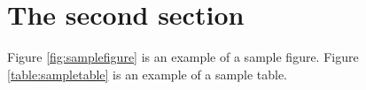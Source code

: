 \section{The second section}
Figure \ref{fig:samplefigure} is an example of a sample figure.
Figure \ref{table:sampletable} is an example of a sample table.

